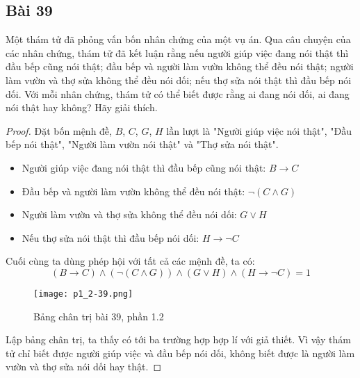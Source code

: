 \subsection*{Bài 39}
Một thám tử đã phỏng vấn bốn nhân chứng của một vụ án. Qua câu chuyện của các nhân chứng, thám tử đã kết luận rằng nếu người giúp việc đang nói thật thì đầu bếp cũng nói thật; đầu bếp và người làm vườn không thể đều nói thật; người làm vườn và thợ sửa không thể đều nói dối; nếu thợ sửa nói thật thì đầu bếp nói dối. Với mỗi nhân chứng, thám tử có thể biết được rằng ai đang nói dối, ai đang nói thật hay không? Hãy giải thích.
\begin{proof}
    Đặt bốn mệnh đề, $B$, $C$, $G$, $H$ lần lượt là "Người giúp việc nói thật", "Đầu bếp nói thật", "Người làm vườn nói thật" và "Thợ sửa nói thật". \begin{itemize}
        \item Người giúp việc đang nói thật thì đầu bếp cũng nói thật: $B\rightarrow C$
        \item Đầu bếp và người làm vườn không thể đều nói thật: $\neg(C\land G)$
        \item Người làm vườn và thợ sửa không thể đều nói dối: $G\lor H$
        \item Nếu thợ sửa nói thật thì đầu bếp nói dối: $H\rightarrow\neg C$
    \end{itemize}
    Cuối cùng ta dùng phép hội với tất cả các mệnh đề, ta có: $$(B\rightarrow C)\land(\neg(C\land G))\land(G\lor H)\land(H\rightarrow\neg C)=1$$
    \begin{figure}
        \caption{Bảng chân trị bài 39, phần 1.2}
        \begin{center}
            \texttt{[image: p1\_2-39.png]}
        \end{center}
    \end{figure}
    \par Lập bảng chân trị, ta thấy có tới ba trường hợp hợp lí với giả thiết. Vì vậy thám tử chỉ biết được người giúp việc và đầu bếp nói dối, không biết được là người làm vườn và thợ sửa nói dối hay thật.
\end{proof}
